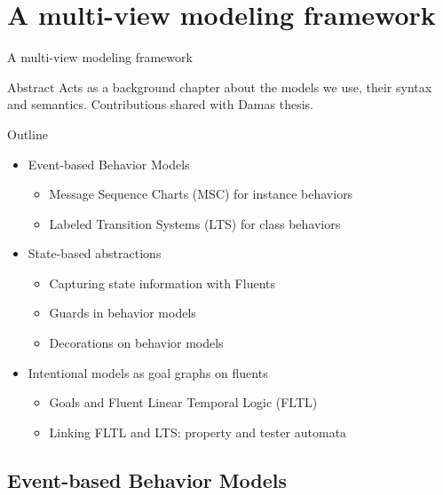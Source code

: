 \section{A multi-view modeling framework} 

\begin{frame}{A multi-view modeling framework} 
  \begin{block}{Abstract}
    Acts as a background chapter about the models we use, their syntax and semantics. 
    Contributions shared with Damas thesis.
  \end{block}
  \begin{block}{Outline}
    \begin{itemize}
      \item Event-based Behavior Models
        \begin{itemize}
          \item Message Sequence Charts (MSC) for instance behaviors 
          \item Labeled Transition Systems (LTS) for class behaviors
        \end{itemize}
      \item State-based abstractions
        \begin{itemize}
          \item Capturing state information with Fluents
          \item Guards in behavior models
          \item Decorations on behavior models
        \end{itemize}
      \item Intentional models as goal graphs on fluents
        \begin{itemize}
          \item Goals and Fluent Linear Temporal Logic (FLTL)
          \item Linking FLTL and LTS: property and tester automata
        \end{itemize}
    \end{itemize}
  \end{block}
\end{frame}

\subsection{Event-based Behavior Models}

